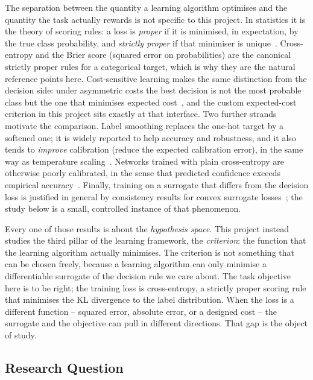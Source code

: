 \documentclass[11pt]{article}
\begin{document}
The separation between the quantity a learning algorithm optimises and the quantity the task
actually rewards is not specific to this project. In statistics it is the theory of scoring
rules: a loss is \emph{proper} if it is minimised, in expectation, by the true class
probability, and \emph{strictly proper} if that minimiser is unique~\parencite{brier1950,gneiting2007}.
Cross-entropy and the Brier score (squared error on probabilities) are the canonical strictly
proper rules for a categorical target, which is why they are the natural reference points here.
Cost-sensitive learning makes the same distinction from the decision side: under asymmetric
costs the best decision is not the most probable class but the one that minimises expected
cost~\parencite{elkan2001}, and the custom expected-cost criterion in this project sits exactly at
that interface. Two further strands motivate the comparison. Label smoothing replaces the
one-hot target by a softened one; it is widely reported to help accuracy and robustness, and it
also tends to \emph{improve} calibration (reduce the expected calibration error), in the same
way as temperature scaling~\parencite{szegedy2016,muller2019}. Networks trained with plain
cross-entropy are otherwise poorly calibrated, in the sense that predicted confidence exceeds
empirical accuracy~\parencite{guo2017}. Finally, training on a surrogate that differs from the decision loss
is justified in general by consistency results for convex surrogate losses~\parencite{bartlett2006};
the study below is a small, controlled instance of that phenomenon.

Every one of those results is about the \emph{hypothesis space}. This project instead studies
the third pillar of the learning framework, the \emph{criterion}: the function that the
learning algorithm actually minimises. The criterion is not something that can be chosen
freely, because a learning algorithm can only minimise a differentiable surrogate of the
decision rule we care about. The task objective here is to be right; the training loss is
cross-entropy, a strictly proper scoring rule that minimises the KL divergence to the label
distribution. When the loss is a different function -- squared error, absolute error, or a
designed cost -- the surrogate and the objective can pull in different directions. That gap is
the object of study.

\subsection{Research Question}
\end{document}
